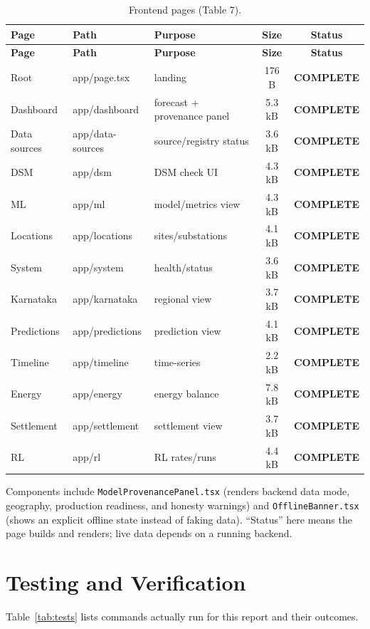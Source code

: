 \documentclass[11pt,a4paper]{article}
\newcommand{\stC}{\textcolor{cok}{\textbf{COMPLETE}}}
\newcommand{\code}[1]{\texttt{\small #1}}
\begin{document}
\begin{footnotesize}
\begin{longtable}{@{}p{2.2cm}p{2.6cm}p{4.0cm}c c@{}}
\caption{Frontend pages (Table 7).}\label{tab:frontend}\\
\toprule
\textbf{Page} & \textbf{Path} & \textbf{Purpose} & \textbf{Size} & \textbf{Status}\\
\midrule
\endfirsthead
\toprule
\textbf{Page} & \textbf{Path} & \textbf{Purpose} & \textbf{Size} & \textbf{Status}\\
\midrule
\endhead
\bottomrule
\endfoot
Root & app/page.tsx & landing & 176 B & \stC\\
Dashboard & app/dashboard & forecast + provenance panel & 5.3 kB & \stC\\
Data sources & app/data-sources & source/registry status & 3.6 kB & \stC\\
DSM & app/dsm & DSM check UI & 4.3 kB & \stC\\
ML & app/ml & model/metrics view & 4.3 kB & \stC\\
Locations & app/locations & sites/substations & 4.1 kB & \stC\\
System & app/system & health/status & 3.6 kB & \stC\\
Karnataka & app/karnataka & regional view & 3.7 kB & \stC\\
Predictions & app/predictions & prediction view & 4.1 kB & \stC\\
Timeline & app/timeline & time-series & 2.2 kB & \stC\\
Energy & app/energy & energy balance & 7.8 kB & \stC\\
Settlement & app/settlement & settlement view & 3.7 kB & \stC\\
RL & app/rl & RL rates/runs & 4.4 kB & \stC\\
\bottomrule
\end{longtable}
\end{footnotesize}

\noindent Components include \code{ModelProvenancePanel.tsx} (renders backend data mode,
geography, production readiness, and honesty warnings) and \code{OfflineBanner.tsx} (shows
an explicit offline state instead of faking data). ``Status'' here means the page builds
and renders; live data depends on a running backend.

\section{Testing and Verification}
Table~\ref{tab:tests} lists commands actually run for this report and their outcomes.
\end{document}
